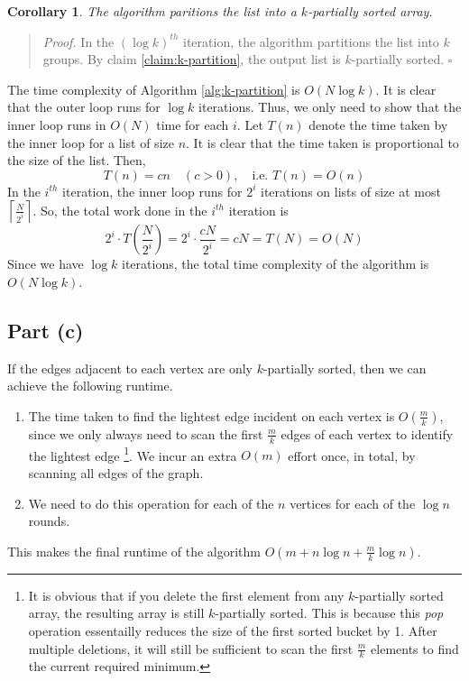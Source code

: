 \documentclass[9pt]{article}
\newtheorem{corollary}{Corollary}
\begin{document}
\begin{corollary}
    The algorithm paritions the list into a $k$-partially sorted array.
\end{corollary}
\begin{quote}
\textit{Proof.}
    In the $(\log{k})^{th}$ iteration, the algorithm partitions the list into $k$ groups.
    By claim \ref{claim:k-partition}, the output list is $k$-partially sorted.
\hfill $\square$
\end{quote}
The time complexity of Algorithm \ref{alg:k-partition} is $O(N \log{k})$. It is clear that the outer
loop runs for $\log{k}$ iterations. Thus, we only need to show that the inner loop runs in $O(N)$
time for each $i$. Let $T(n)$ denote the time taken by the inner loop for a list of size $n$. It is
clear that the time taken is proportional to the size of the list. Then,
\begin{equation}
    T(n) = cn \quad (c > 0), \quad \text{i.e. } T(n) = O(n)
\end{equation}
In the $i^{th}$ iteration, the inner loop runs for $2^{i}$ iterations on lists of size at most
$\left\lceil \frac{N}{2^{i}} \right\rceil$. So, the total work done in the $i^{th}$ iteration is
\begin{equation}
    2^{i} \cdot T\left(\frac{N}{2^{i}}\right) = 2^{i} \cdot \frac{cN}{2^{i}} = cN = T(N) = O(N)
\end{equation}
Since we have $\log{k}$ iterations, the total time complexity of the algorithm is $O(N \log{k})$.

\subsection*{Part (c)}
If the edges adjacent to each vertex are only $k$-partially sorted, then we can achieve the following runtime.
\begin{enumerate}
    \item The time taken to find the lightest edge incident on each vertex is $O\left( \frac{m}{k} \right)$,
    since we only always need to scan the first $\frac{m}{k}$ edges of each vertex to identify the lightest edge
    \footnote{It is obvious that if you delete the first element from any $k$-partially sorted array, the resulting
    array is still $k$-partially sorted. This is because this \textit{pop} operation essentailly reduces the size of
    the first sorted bucket by 1. After multiple deletions, it will still be sufficient to scan the first $\frac{m}{k}$
    elements to find the current required minimum.}.
    We incur an extra $O(m)$ effort once, in total, by scanning all edges of the graph.
    \item We need to do this operation for each of the $n$ vertices for each of the $\log{n}$ rounds.
\end{enumerate}
This makes the final runtime of the algorithm $O\left( m + n\log{n} + \frac{m}{k}\log{n} \right)$.
\end{document}
